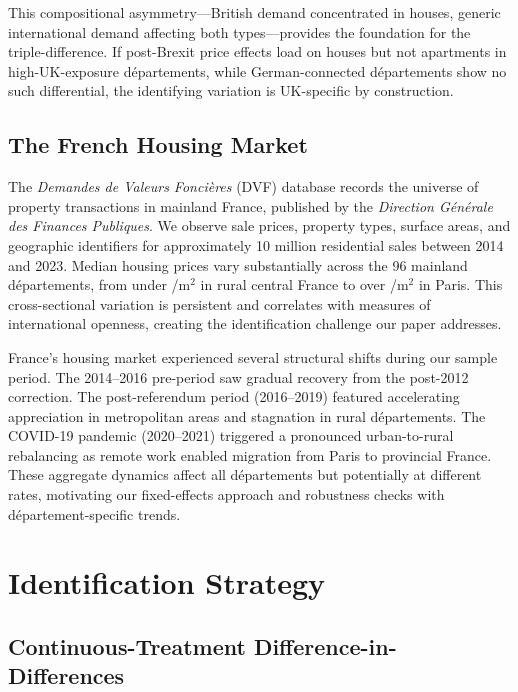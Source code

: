 \documentclass[12pt]{article}
\begin{document}
This compositional asymmetry---British demand concentrated in houses, generic international demand affecting both types---provides the foundation for the triple-difference. If post-Brexit price effects load on houses but not apartments in high-UK-exposure d\'epartements, while German-connected d\'epartements show no such differential, the identifying variation is UK-specific by construction.

\subsection{The French Housing Market}

The \textit{Demandes de Valeurs Fonci\`eres} (DVF) database records the universe of property transactions in mainland France, published by the \textit{Direction G\'en\'erale des Finances Publiques}. We observe sale prices, property types, surface areas, and geographic identifiers for approximately 10 million residential sales between 2014 and 2023. Median housing prices vary substantially across the 96 mainland d\'epartements, from under /m$^2$ in rural central France to over /m$^2$ in Paris. This cross-sectional variation is persistent and correlates with measures of international openness, creating the identification challenge our paper addresses.

France's housing market experienced several structural shifts during our sample period. The 2014--2016 pre-period saw gradual recovery from the post-2012 correction. The post-referendum period (2016--2019) featured accelerating appreciation in metropolitan areas and stagnation in rural d\'epartements. The COVID-19 pandemic (2020--2021) triggered a pronounced urban-to-rural rebalancing as remote work enabled migration from Paris to provincial France. These aggregate dynamics affect all d\'epartements but potentially at different rates, motivating our fixed-effects approach and robustness checks with d\'epartement-specific trends.


\section{Identification Strategy}\label{sec:identification}

\subsection{Continuous-Treatment Difference-in-Differences}
\end{document}

